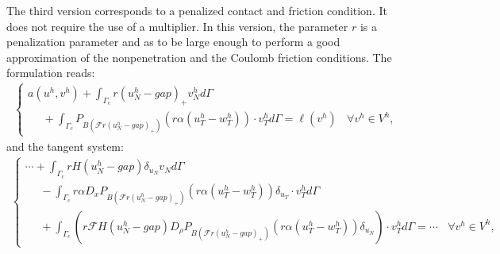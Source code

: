 \documentclass[a4paper,11pt,english]{sphinxmanual}
\begin{document}
The third version corresponds to a penalized contact and friction condition. It does not require the use of a multiplier. In this version, the parameter \(r\) is a penalization parameter and as to be large enough to perform a good approximation of the non\sphinxhyphen{}penetration and the Coulomb friction conditions. The formulation reads:
\begin{equation*}
\begin{split}\left\{\begin{array}{l}
a(u^h, v^h) + \displaystyle \int_{\Gamma_c} r(u^h_N-gap)_+ v^h_N d\Gamma \\
~~~~~~ + \displaystyle \int_{\Gamma_c} P_{B(\mathscr F r(u^h_N-gap)_+)}(r\alpha(u^h_T-w^h_T))\cdot v^h_T d\Gamma = \ell(v^h) ~~~~ \forall v^h \in V^h,
\end{array}\right.\end{split}
\end{equation*}
and the tangent system:
\begin{equation*}
\begin{split}\left\{\begin{array}{l}
\cdots + \displaystyle \int_{\Gamma_c} rH(u^h_N-gap)\delta_{u_N} v_N d\Gamma \\
~~~~~~- \displaystyle \int_{\Gamma_c} r \alpha D_xP_{B(\mathscr F r(u^h_N-gap)_+)}(r\alpha(u^h_T-w^h_T)) \delta_{u_T}\cdot v^h_T d\Gamma \\
~~~~~~+ \displaystyle \int_{\Gamma_c} ({r\mathscr F} H(u^h_N-gap) D_{\rho}P_{B(\mathscr F r(u^h_N-gap)_+)}(r\alpha(u^h_T-w^h_T)) \delta_{u_N})\cdot v^h_T d\Gamma = \cdots  ~~~~ \forall v^h \in V^h,
\end{array}\right.\end{split}
\end{equation*}
\end{document}
